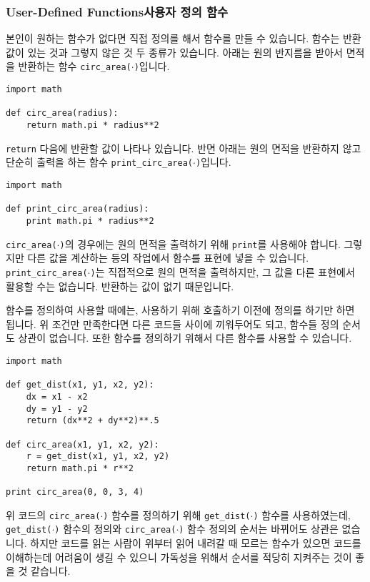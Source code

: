 \documentclass[../main.tex]{subfiles}
\begin{document}
\subsubsection{User-Defined Functions사용자 정의 함수}
본인이 원하는 함수가 없다면 직접 정의를 해서 함수를 만들 수 있습니다.
함수는 반환 값이 있는 것과 그렇지 않은 것 두 종류가 있습니다.
아래는 원의 반지름을 받아서 면적을 반환하는 함수 \texttt{circ\_area($\cdot$)}입니다.
\begin{verbatim}
import math

def circ_area(radius):
	return math.pi * radius**2
\end{verbatim}
\texttt{return} 다음에 반환할 값이 나타나 있습니다.
반면 아래는 원의 면적을 반환하지 않고 단순히 출력을 하는 함수 \texttt{print\_circ\_area($\cdot$)}입니다.
\begin{verbatim}
import math

def print_circ_area(radius):
	print math.pi * radius**2
\end{verbatim}
\texttt{circ\_area($\cdot$)}의 경우에는 원의 면적을 출력하기 위해 \texttt{print}를 사용해야 합니다.
그렇지만 다른 값을 계산하는 등의 작업에서 함수를 표현에 넣을 수 있습니다.
\texttt{print\_circ\_area($\cdot$)}는 직접적으로 원의 면적을 출력하지만, 그 값을 다른 표현에서 활용할 수는 없습니다.
반환하는 값이 없기 때문입니다.

함수를 정의하여 사용할 때에는, 사용하기 위해 호출하기 이전에 정의를 하기만 하면 됩니다.
위 조건만 만족한다면 다른 코드들 사이에 끼워두어도 되고, 함수들 정의 순서도 상관이 없습니다.
또한 함수를 정의하기 위해서 다른 함수를 사용할 수 있습니다.
\begin{verbatim}
import math

def get_dist(x1, y1, x2, y2):
	dx = x1 - x2
	dy = y1 - y2
	return (dx**2 + dy**2)**.5
	
def circ_area(x1, y1, x2, y2):
	r = get_dist(x1, y1, x2, y2)
	return math.pi * r**2
	
print circ_area(0, 0, 3, 4)
\end{verbatim}
위 코드의 \texttt{circ\_area($\cdot$)} 함수를 정의하기 위해 \texttt{get\_dist($\cdot$)} 함수를 사용하였는데, \texttt{get\_dist($\cdot$)} 함수의 정의와 \texttt{circ\_area($\cdot$)} 함수 정의의 순서는 바뀌어도 상관은 없습니다.
하지만 코드를 읽는 사람이 위부터 읽어 내려갈 때 모르는 함수가 있으면 코드를 이해하는데 어려움이 생길 수 있으니 가독성을 위해서 순서를 적당히 지켜주는 것이 좋을 것 같습니다.
\end{document}
